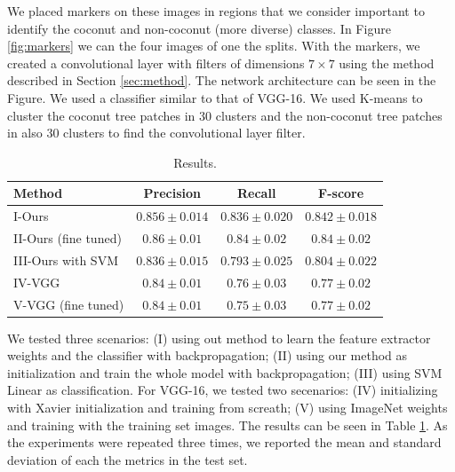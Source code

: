 \documentclass[a4paper,conference]{IEEEtran}
\begin{document}
We placed markers on these images in regions that we consider important to identify the coconut and non-coconut (more diverse) classes. In Figure \ref{fig:markers} we can the four images of one the splits. With the markers, we created a convolutional layer with filters of dimensions $7 \times 7$ using the method described in Section \ref{sec:method}. The network architecture can be seen in the Figure. We used a classifier similar to that of VGG-16. We used K-means to cluster the coconut tree patches in 30 clusters and the non-coconut tree patches in also 30 clusters to find the convolutional layer filter. 

\begin{table}[!t]
  \begin{center}
  \begin{tabular}{|l|c|c|c|}
  \hline
   Method & Precision & Recall & F-score \\
  \hline\hline
    I-Ours & $\boldsymbol{0.856 \pm 0.014}$ & $\boldsymbol{0.836 \pm 0.020}$ & $\boldsymbol{0.842 \pm 0.018}$\\
    II-Ours (fine tuned) & $\boldsymbol{0.86 \pm 0.01}$ & $\boldsymbol{0.84 \pm 0.02}$ & $0.84 \pm 0.02$\\
    III-Ours with SVM & $0.836 \pm 0.015 $ & $ 0.793 \pm 0.025$ & $ 0.804 \pm 0.022$\\
    IV-VGG & $0.84 \pm 0.01$ & $0.76 \pm 0.03$ & $0.77 \pm 0.02 $ \\
    V-VGG (fine tuned) & $0.84 \pm 0.01$ & $0.75 \pm 0.03$ & $0.77 \pm 0.02 $ \\
  \hline
  \end{tabular}
  \end{center}
  \caption{Results.}
  \label{tab:results}
\end{table}


We tested three scenarios: (I) using out method to learn the feature extractor weights and the classifier with backpropagation; (II) using our method as initialization and train the whole model with backpropagation; (III) using SVM Linear as classification. For VGG-16, we tested two secenarios: (IV) initializing with Xavier initialization and training from screath; (V) using ImageNet weights and training with the training set images. The results can be seen in Table \ref{tab:results}. As the experiments were repeated three times, we reported the mean and standard deviation of each the metrics in the test set. 
\end{document}
